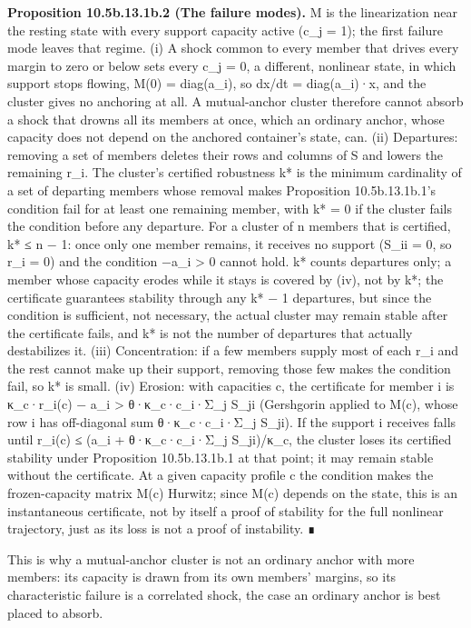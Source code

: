 \documentclass[
]{article}
\begin{document}
\textbf{Proposition 10.5b.13.1b.2 (The failure modes).} M is the
linearization near the resting state with every support capacity active
(c\_j = 1); the first failure mode leaves that regime. (i) A shock
common to every member that drives every margin to zero or below sets
every c\_j = 0, a different, nonlinear state, in which support stops
flowing, M(0) = diag(a\_i), so dx/dt = diag(a\_i)·x, and the cluster
gives no anchoring at all. A mutual-anchor cluster therefore cannot
absorb a shock that drowns all its members at once, which an ordinary
anchor, whose capacity does not depend on the anchored container's
state, can. (ii) Departures: removing a set of members deletes their
rows and columns of S and lowers the remaining r\_i. The cluster's
certified robustness k* is the minimum cardinality of a set of departing
members whose removal makes Proposition 10.5b.13.1b.1's condition fail
for at least one remaining member, with k* = 0 if the cluster fails the
condition before any departure. For a cluster of n members that is
certified, k* ≤ n − 1: once only one member remains, it receives no
support (S\_ii = 0, so r\_i = 0) and the condition −a\_i \textgreater{}
0 cannot hold. k* counts departures only; a member whose capacity erodes
while it stays is covered by (iv), not by k*; the certificate guarantees
stability through any k* − 1 departures, but since the condition is
sufficient, not necessary, the actual cluster may remain stable after
the certificate fails, and k* is not the number of departures that
actually destabilizes it. (iii) Concentration: if a few members supply
most of each r\_i and the rest cannot make up their support, removing
those few makes the condition fail, so k* is small. (iv) Erosion: with
capacities c, the certificate for member i is κ\_c·r\_i(c) − a\_i
\textgreater{} θ·κ\_c·c\_i·Σ\_j S\_ji (Gershgorin applied to M(c), whose
row i has off-diagonal sum θ·κ\_c·c\_i·Σ\_j S\_ji). If the support i
receives falls until r\_i(c) ≤ (a\_i + θ·κ\_c·c\_i·Σ\_j S\_ji)/κ\_c, the
cluster loses its certified stability under Proposition 10.5b.13.1b.1 at
that point; it may remain stable without the certificate. At a given
capacity profile c the condition makes the frozen-capacity matrix M(c)
Hurwitz; since M(c) depends on the state, this is an instantaneous
certificate, not by itself a proof of stability for the full nonlinear
trajectory, just as its loss is not a proof of instability. ∎

This is why a mutual-anchor cluster is not an ordinary anchor with more
members: its capacity is drawn from its own members' margins, so its
characteristic failure is a correlated shock, the case an ordinary
anchor is best placed to absorb.
\end{document}
